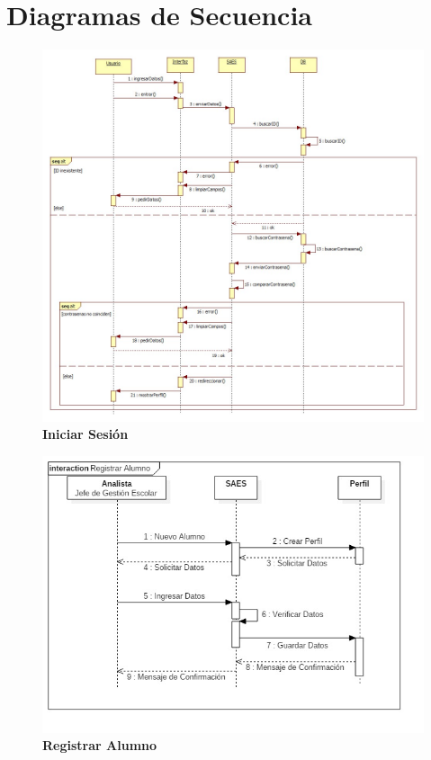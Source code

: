 \chapter{Diagramas de Secuencia}
\begin{figure}[H]
  \centering
    \includegraphics[scale=0.5]{project/Secuencia/Iniciar_Sesion.jpg}
  \caption{\textbf{Iniciar Sesión}}
\end{figure}
\begin{figure}[H]
  \centering
    \includegraphics[scale=0.7]{project/Secuencia/Registrar_Alumno.jpg}
  \caption{\textbf{Registrar Alumno}}
\end{figure}
